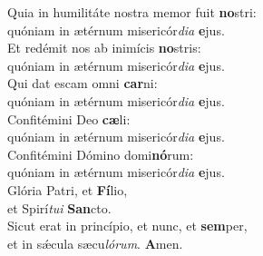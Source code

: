 \evenverse Quia in humilitáte nostra memor fuit \textbf{no}stri:~\*\\
\evenverse quóniam in ætérnum misericór\textit{di}\textit{a} \textbf{e}jus.\\
\oddverse Et redémit nos ab inimícis \textbf{no}stris:~\*\\
\oddverse quóniam in ætérnum misericór\textit{di}\textit{a} \textbf{e}jus.\\
\evenverse Qui dat escam omni \textbf{car}ni:~\*\\
\evenverse quóniam in ætérnum misericór\textit{di}\textit{a} \textbf{e}jus.\\
\oddverse Confitémini Deo \textbf{cæ}li:~\*\\
\oddverse quóniam in ætérnum misericór\textit{di}\textit{a} \textbf{e}jus.\\
\evenverse Confitémini Dómino domi\textbf{nó}rum:~\*\\
\evenverse quóniam in ætérnum misericór\textit{di}\textit{a} \textbf{e}jus.\\
\oddverse Glória Patri, et \textbf{Fí}lio,~\*\\
\oddverse et Spirí\textit{tu}\textit{i} \textbf{San}cto.\\
\evenverse Sicut erat in princípio, et nunc, et \textbf{sem}per,~\*\\
\evenverse et in sǽcula sæcu\textit{ló}\textit{rum}. \textbf{A}men.\\
